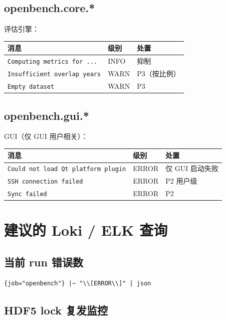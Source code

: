 \subsection{openbench.core.*}

评估引擎：

\begin{longtable}{p{6cm} p{2cm} p{4cm}}
  \toprule
  消息 & 级别 & 处置 \\
  \midrule
  \endhead
  \texttt{Computing metrics for ...} & INFO & 抑制 \\
  \texttt{Insufficient overlap years} & WARN & P3（按比例） \\
  \texttt{Empty dataset} & WARN & P3 \\
  \bottomrule
\end{longtable}

\subsection{openbench.gui.*}

GUI（仅 GUI 用户相关）：

\begin{longtable}{p{6cm} p{2cm} p{4cm}}
  \toprule
  消息 & 级别 & 处置 \\
  \midrule
  \endhead
  \texttt{Could not load Qt platform plugin} & ERROR & 仅 GUI 启动失败 \\
  \texttt{SSH connection failed} & ERROR & P2 用户级 \\
  \texttt{Sync failed} & ERROR & P2 \\
  \bottomrule
\end{longtable}

\section{建议的 Loki / ELK 查询}

\subsection{当前 run 错误数}

\begin{verbatim}
{job="openbench"} |~ "\\[ERROR\\]" | json
\end{verbatim}

\subsection{HDF5 lock 复发监控}

